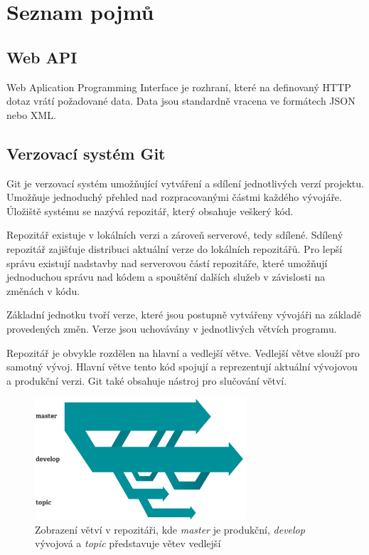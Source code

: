 \documentclass[thesis=B,czech]{FITthesis}[2012/06/26]
\begin{document}
\chapter{Seznam pojmů}

\section{Web API}
Web Aplication Programming Interface je rozhraní, které na definovaný HTTP dotaz vrátí požadované data. Data jsou standardně vracena ve formátech JSON nebo XML.

\section{Verzovací systém Git}
Git\cite{GIT} je verzovací systém umožňující vytváření a sdílení jednotlivých verzí projektu.
Umožňuje jednoduchý přehled nad rozpracovanými částmi každého vývojáře. Úložiště systému se nazývá repozitář, který obsahuje veškerý kód.
\par
Repozitář existuje v lokálních verzi a zároveň serverové, tedy sdílené. Sdílený repozitář zajišťuje distribuci aktuální verze do lokálních 
repozitářů. Pro lepší správu existují nadstavby nad serverovou částí repozitáře, které umožňují jednoduchou
správu nad kódem a spouštění dalších služeb v závislosti na změnách v kódu.
\par
Základní jednotku tvoří verze, které jsou postupně vytvářeny vývojáři na základě provedených změn.
Verze jsou uchovávány v jednotlivých větvích programu. 
\par
Repozitář je obvykle rozdělen na hlavní a vedlejší větve. Vedlejší větve slouží pro samotný vývoj. 
Hlavní větve tento kód spojují a reprezentují aktuální vývojovou a produkční verzi. Git také obsahuje nástroj pro slučování větví.

\begin{figure}[h]\centering
 	\includegraphics[width=0.7\textwidth]{resources/branches}
	\caption[Větve v Git repozitáři]{Zobrazení větví v repozitáři, kde \textit{master} je produkční, \textit{develop} vývojová a \textit{topic}
	představuje větev vedlejší}\label{fig:vetev}
\end{figure}
\end{document}
